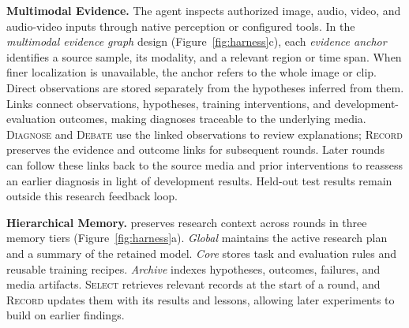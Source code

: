 \noindent\textbf{Multimodal Evidence.}
The agent inspects authorized image, audio, video, and audio-video inputs through native perception or configured tools. In the \emph{multimodal evidence graph} design (Figure~\ref{fig:harness}c), each \emph{evidence anchor} identifies a source sample, its modality, and a relevant region or time span. When finer localization is unavailable, the anchor refers to the whole image or clip. Direct observations are stored separately from the hypotheses inferred from them. Links connect observations, hypotheses, training interventions, and development-evaluation outcomes, making diagnoses traceable to the underlying media. \textsc{Diagnose} and \textsc{Debate} use the linked observations to review explanations; \textsc{Record} preserves the evidence and outcome links for subsequent rounds. Later rounds can follow these links back to the source media and prior interventions to reassess an earlier diagnosis in light of development results. Held-out test results remain outside this research feedback loop.

\noindent\textbf{Hierarchical Memory.}
\harness{} preserves research context across rounds in three memory tiers (Figure~\ref{fig:harness}a). \emph{Global} maintains the active research plan and a summary of the retained model. \emph{Core} stores task and evaluation rules and reusable training recipes. \emph{Archive} indexes hypotheses, outcomes, failures, and media artifacts. \textsc{Select} retrieves relevant records at the start of a round, and \textsc{Record} updates them with its results and lessons, allowing later experiments to build on earlier findings.

